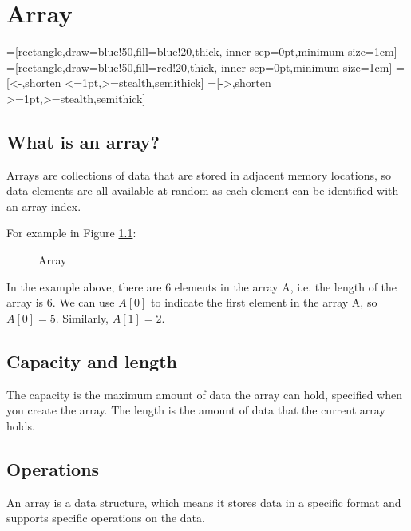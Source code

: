 \message{ !name(algorithms.tex)}\documentclass[a4paper,10pt]{book}
\begin{document}

\chapter{Array}

=[rectangle,draw=blue!50,fill=blue!20,thick, inner sep=0pt,minimum size=1cm]
=[rectangle,draw=blue!50,fill=red!20,thick, inner sep=0pt,minimum size=1cm]
=[<-,shorten <=1pt,>=stealth,semithick]
=[->,shorten >=1pt,>=stealth,semithick]
\section{What is an array?}

Arrays are collections of data that are stored in adjacent memory locations, so data elements are all available at random as each element can be identified with an array index.


For example in Figure \ref{fig:array-index}:
\begin{figure}[!htp]
  \centering
  
  \caption{Array}
  \label{fig:array-index}
\end{figure}


In the example above, there are 6 elements in the array A, i.e. the
length of the array is 6. We can use $A[0]$ to indicate the first
element in the array A, so$A[0] = 5$. Similarly, $A[1] = 2$.




\section{Capacity and length}


The capacity is the maximum amount of data the array can hold, specified when you create the array.
The length is the amount of data that the current array holds.


\section{Operations}


An array is a data structure, which means it stores data in a specific format and supports specific operations on the data.
\end{document}
